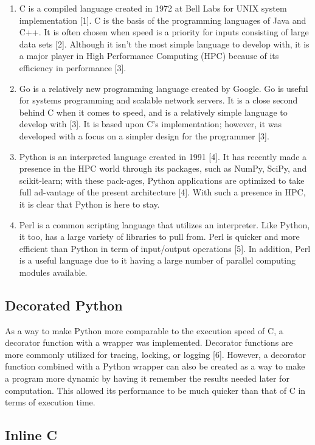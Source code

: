 \documentclass{sig-alternate}
\begin{document}
\begin{enumerate}
\item {\em}C is a compiled language created in 1972 at Bell Labs for UNIX system implementation [1]. C is the basis of the programming languages of Java and C++. It is often chosen when speed is a priority for inputs consisting of large data sets [2]. Although it isn't the most simple language to develop with, it is a major player in High Performance Computing (HPC) because of its efficiency in performance [3].
\item {\em}Go is a relatively new programming language created by Google. Go is useful for systems programming and scalable network servers. It is a close second behind C when it comes to speed, and is a relatively simple language to develop with [3]. It is based upon C's implementation; however, it was developed with a focus on a simpler design for the programmer [3]. 
\item {\em}Python is an interpreted language created in 1991 [4]. It has recently made a presence in the HPC world through its packages, such as NumPy, SciPy, and scikit-learn; with these pack-ages, Python applications are optimized to take full 
ad-vantage of the present architecture [4]. With such a presence in HPC, it is clear that Python is here to stay.
\item  {\em}Perl is a common scripting language that utilizes an interpreter. Like Python, it too, has a large variety of libraries to pull from. Perl is quicker and more efficient than Python in term of input/output operations [5]. In addition, Perl is a useful language due to it having a large number of parallel computing modules available.
\end{enumerate}


\subsection{Decorated Python}

As a way to make Python more comparable to the execution speed of C, a decorator function with a wrapper was implemented. Decorator functions are more commonly utilized for tracing, locking, or logging [6]. However, a decorator function combined with a Python wrapper can also be created as a way to make a program more dynamic by having it remember the results needed later for computation. This allowed its performance to be much quicker than that of C in terms of execution time.

\subsection{Inline C}
\end{document}

